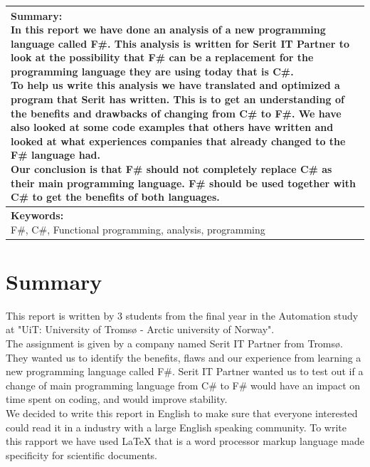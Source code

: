 \documentclass[12pt, a4paper]{article}
\begin{document}
\begin{tabularx}{\textwidth}{|X|}
\hline
\pbox{\linewidth}{
\vspace{1mm}
\textbf{Summary:}\\
In this report we have done an analysis of a new programming language called F\#. This analysis is written for Serit IT Partner to look at the possibility that F\# can be a replacement for the programming language they are using today that is C\#.\\[2mm]
To help us write this analysis we have translated and optimized a program that Serit has written. This is to get an understanding of the benefits and drawbacks of changing from C\# to F\#. We have also looked at some code examples that others have written and looked at what experiences  companies that already changed to the F\# language had.\\[2mm]
Our conclusion is that F\# should not completely replace C\# as their main programming language. F\# should be used together with C\# to get the benefits of both languages. 
\vspace{1mm}
}
\\
\hline
\pbox{\linewidth}{
\vspace{1mm}
\textbf{Keywords:}\\
F\#, C\#, Functional programming, analysis, programming
\vspace{1mm}
}
\\

\hline
\end{tabularx}


\newpage
\section*{Summary}
This report is written by 3 students from the final year in the Automation study at "UiT: University of Tromsø - Arctic university of Norway".\\

The assignment is given by a company named Serit IT Partner from Tromsø. They wanted us to identify the benefits, flaws and our experience from learning a new programming language called F\#. Serit IT Partner wanted us to test out if a change of main programming language from C\# to F\# would have an impact on time spent on coding, and would improve stability.\\

We decided to write this report in English to make sure that everyone interested could read it in a industry with a large English speaking community. To write this rapport we have used LaTeX that is a word processor markup language made specificity for scientific documents.\\
\end{document}
